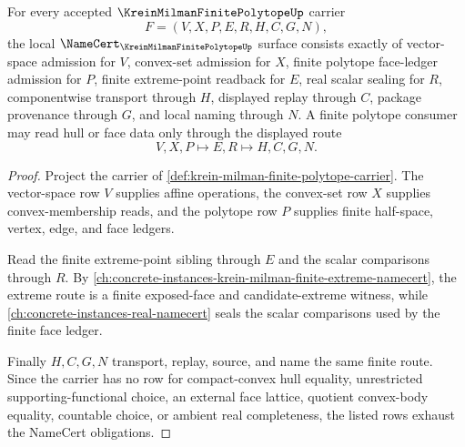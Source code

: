 \begin{theorem}
\label{thm:krein-milman-finite-polytope-namecert-obligations}
For every accepted $\KreinMilmanFinitePolytopeUp$ carrier
$$
F=(V,X,P,E,R,H,C,G,N),
$$
the local $\NameCert_{\KreinMilmanFinitePolytopeUp}$ surface consists exactly of vector-space admission for $V$, convex-set admission for $X$, finite polytope face-ledger admission for $P$, finite extreme-point readback for $E$, real scalar sealing for $R$, componentwise transport through $H$, displayed replay through $C$, package provenance through $G$, and local naming through $N$. A finite polytope consumer may read hull or face data only through the displayed route
$$
V,X,P \longmapsto E,R \longmapsto H,C,G,N.
$$
\end{theorem}
\begin{proof}
Project the carrier of \autoref{def:krein-milman-finite-polytope-carrier}. The vector-space row $V$ supplies affine operations, the convex-set row $X$ supplies convex-membership reads, and the polytope row $P$ supplies finite half-space, vertex, edge, and face ledgers.

Read the finite extreme-point sibling through $E$ and the scalar comparisons through $R$. By \autoref{ch:concrete-instances-krein-milman-finite-extreme-namecert}, the extreme route is a finite exposed-face and candidate-extreme witness, while \autoref{ch:concrete-instances-real-namecert} seals the scalar comparisons used by the finite face ledger.

Finally $H,C,G,N$ transport, replay, source, and name the same finite route. Since the carrier has no row for compact-convex hull equality, unrestricted supporting-functional choice, an external face lattice, quotient convex-body equality, countable choice, or ambient real completeness, the listed rows exhaust the NameCert obligations.
\end{proof}

